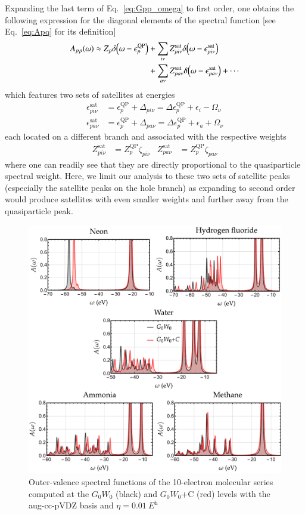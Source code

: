 \documentclass[aip,jcp,reprint,noshowkeys,superscriptaddress]{revtex4-2}
\newcommand{\QP}{\text{QP}}
\newcommand{\sat}{\text{sat}}
\newcommand{\eps}{\epsilon}
\newcommand{\Om}{\Omega}
\begin{document}
Expanding the last term of Eq.~\eqref{eq:Gpp_omega} to first order, one obtains the following expression for the diagonal elements of the spectral function [see Eq.~\eqref{eq:Apq} for its definition]
\begin{equation} 
\begin{split} 
	A_{pp}(\omega) 
	\approx Z_p \delta\qty(\omega - \eps_p^\QP) 
	& + \sum_{i\nu} Z_{pi\nu}^\sat \delta\qty(\omega - \eps_{pi\nu}^\sat) 
	\\
	& + \sum_{a\nu} Z_{pa\nu}^\sat \delta\qty(\omega - \eps_{pa\nu}^\sat) + \cdots
\end{split}
\end{equation}
which features two sets of satellites at energies
\begin{align}
	\eps_{pi\nu}^\sat & = \eps_p^\QP + \Delta_{pi\nu} = \Delta \eps_p^\QP + \eps_i - \Om_\nu
	\\
	\eps_{pa\nu}^\sat & = \eps_p^\QP + \Delta_{pa\nu} = \Delta \eps_p^\QP + \eps_a + \Om_\nu
\end{align}
each located on a different branch and associated with the respective weights
\begin{align}
	Z_{pi\nu}^\sat & = Z_{p}^\QP \zeta_{pi\nu}
	&
	Z_{pa\nu}^\sat & = Z_{p}^\QP \zeta_{pa\nu}
\end{align}
where one can readily see that they are directly proportional to the quasiparticle spectral weight.
Here, we limit our analysis to these two sets of satellite peaks (especially the satellite peaks on the hole branch) as expanding to second order would produce satellites with even smaller weights and further away from the quasiparticle peak.

\begin{figure}
	\includegraphics[width=0.8\linewidth]{spectrals}
\caption{
Outer-valence spectral functions of the 10-electron molecular series computed at the $G_0W_0$ (black) and $G_0W_0$+C (red) levels with the aug-cc-pVDZ basis and  $\eta = \SI{0.01}{\hartree}$}
\label{fig:A}
\end{figure}
\end{document}
